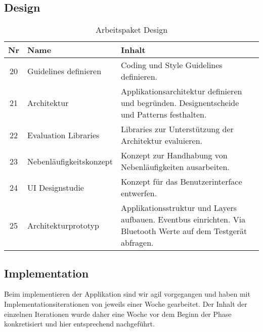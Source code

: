 \subsection{Design}
\begin{table}[H]
\begin{tabularx}{\textwidth}{ c | l | X }
\textbf{Nr} & \textbf{Name} & \textbf{Inhalt} \\ \hline
20 & Guidelines definieren & Coding und Style Guidelines definieren.\\ \hline
21 & Architektur & Applikationsarchitektur definieren und begründen. Designentscheide und Patterns festhalten.\\ \hline
22 & Evaluation Libraries & Libraries zur Unterstützung der Architektur evaluieren.\\ \hline
23 & Nebenläufigkeitskonzept & Konzept zur Handhabung von Nebenläufigkeiten ausarbeiten.\\ \hline
24 & UI Designstudie & Konzept für das Benutzerinterface entwerfen.\\ \hline
25 & Architekturprototyp & Applikationsstruktur und Layers aufbauen. Eventbus einrichten. Via Bluetooth Werte auf dem Testgerät abfragen.\\ 
\end{tabularx}
\caption{Arbeitspaket Design}
\end{table}

\pagebreak
\subsection{Implementation}

Beim implementieren der Applikation sind wir agil vorgegangen und haben mit Implementationsiterationen von jeweils einer Woche gearbeitet. Der Inhalt der einzelnen Iterationen wurde daher eine Woche vor dem Beginn der Phase konkretisiert und hier entsprechend nachgeführt.


